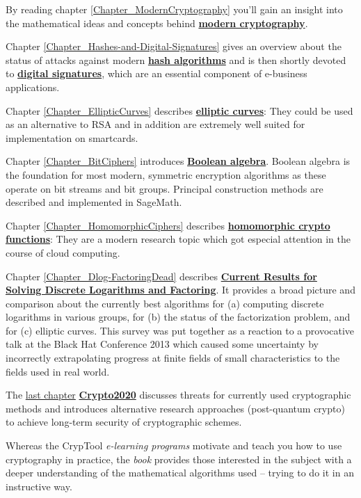 By reading chapter \ref{Chapter_ModernCryptography}
you'll gain an insight into the mathematical ideas and concepts behind 
\hyperlink{Chapter_ModernCryptography}{\bf modern cryptography}.

Chapter \ref{Chapter_Hashes-and-Digital-Signatures} gives
an overview about the status of attacks against modern
\hyperlink{Chapter_Hashes-and-Digital-Signatures}{\bf hash algorithms}
and is then shortly devoted to \hyperlink{Chapter_Hashes-and-Digital-Signatures}
{\bf digital signatures}, 
which are an essential component of e-business applications.

Chapter \ref{Chapter_EllipticCurves} describes \hyperlink{Chapter_EllipticCurves}
{\bf elliptic curves}: They could be used as an alternative to RSA and in addition
are extremely well suited for implementation on smartcards.

Chapter \ref{Chapter_BitCiphers} introduces \hyperlink{Chapter_BitCiphers}{\bf Boolean algebra}.
Boolean algebra is the foundation for most modern, symmetric encryption algorithms
as these operate on bit streams and bit groups. Principal construction
methods are described and implemented in SageMath.

Chapter \ref{Chapter_HomomorphicCiphers} describes
\hyperlink{Chapter_HomomorphicCiphers}{\bf homomorphic crypto
functions}: They are a modern research topic which got especial attention
in the course of cloud computing.

Chapter \ref{Chapter_Dlog-FactoringDead} describes 
\hyperlink{Chapter_Dlog-FactoringDead}{\bf Current Results
for Solving Discrete Logarithms and Factoring}.
It provides a broad picture and comparison about the currently best
algorithms for (a) computing discrete logarithms in various groups,
for (b) the status of the factorization problem, and for (c) elliptic
curves. This survey was put together as a reaction to a provocative
talk at the Black Hat Conference 2013 which caused some uncertainty
by incorrectly extrapolating progress at finite fields of small
characteristics to the fields used in real world.

The \hyperlink{Chapter_Crypto2020}{last chapter}
\hyperlink{Chapter_Crypto2020}{\bf Crypto2020}
discusses threats for currently used cryptographic methods and introduces
alternative research approaches (post-quantum crypto) to achieve long-term
security of cryptographic schemes.

Whereas the CrypTool \textit{e-learning programs} motivate
and teach you how to use cryptography in practice, the \textit{book} provides
those interested in the subject with a deeper understanding of the mathematical
algorithms used -- trying to do it in an instructive way.

